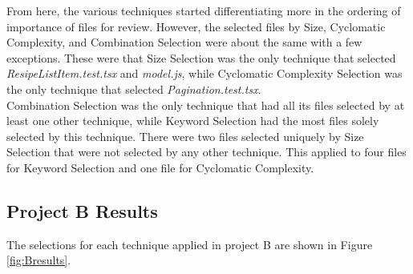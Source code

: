 From here, the various techniques started differentiating more in the ordering of importance of files for review. However, the selected files by Size, Cyclomatic Complexity, and Combination Selection were about the same with a few exceptions. These were that Size Selection was the only technique that selected \textit{ResipeListItem.test.tsx} and \textit{model.js}, while Cyclomatic Complexity Selection was the only technique that selected \textit{Pagination.test.tsx}. \\

Combination Selection was the only technique that had all its files selected by at least one other technique, while Keyword Selection had the most files solely selected by this technique. There were two files selected uniquely by Size Selection that were not selected by any other technique. This applied to four files for Keyword Selection and one file for Cyclomatic Complexity.



\newpage
\subsection{Project B Results} 
The selections for each technique applied in project B are shown in Figure \ref{fig:Bresults}. 

